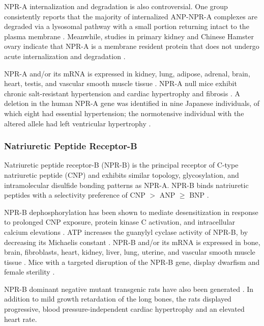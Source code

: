 \documentclass[14pt,a4paper,onecolumn]{extarticle}
\begin{document}
NPR-A internalization and degradation is also controversial. One group consistently reports that the majority of internalized ANP-NPR-A complexes are degraded via a lysosomal pathway with a small portion returning intact to the plasma membrane \citep{Pandey2002}. Meanwhile, studies in primary kidney and Chinese Hamster ovary indicate that NPR-A is a membrane resident protein that does not undergo acute internalization and degradation \citep{Fan2005} \citep{Koh1992} \citep{Vieira2001}.

NPR-A and/or its mRNA is expressed in kidney, lung, adipose, adrenal, brain, heart, testis, and vascular smooth muscle tissue \citep{Goy2001}. NPR-A null mice exhibit chronic salt-resistant hypertension and cardiac hypertrophy and fibrosis \citep{Kuhn2002}.  A deletion in the human NPR-A gene was identified in nine Japanese individuals, of which eight had essential hypertension; the normotensive individual with the altered allele had left ventricular hypertrophy \citep{Nakayama2000}.  %

\subsubsection{Natriuretic Peptide Receptor-B}
Natriuretic peptide receptor-B (NPR-B) is the principal receptor of C-type natriuretic peptide (CNP) and exhibits similar topology, glycosylation, and intramolecular disulfide bonding patterns as NPR-A.
NPR-B binds natriuretic peptides with a selectivity preference of CNP $>$ ANP $\ge$ BNP \citep{Bennett1991} \citep{Koller1991} \citep{Suga1992a}.

NPR-B dephosphorylation has been shown to mediate desensitization in response to prolonged CNP exposure, protein kinase C activation, and intracellular calcium elevations \citep{Potter1998} \citep{Potter2000} \citep{Potthast2004}. ATP increases the guanylyl cyclase activity of NPR-B, by decreasing its Michaelis constant \citep{Antos2007}.
NPR-B and/or its mRNA is expressed in bone, brain, fibroblasts, heart, kidney, liver, lung, uterine, and vascular smooth muscle tissue \citep{Bryan2006} \citep{Dickey2007}. Mice with a targeted disruption of the NPR-B gene, display dwarfism and  female sterility \citep{Tamura2004}.

NPR-B dominant negative mutant transgenic rats have also been generated \citep{Langenickel2006}. In addition to mild growth retardation of the long bones, the rats displayed progressive, blood pressure-independent cardiac hypertrophy and an elevated heart rate.
\end{document}
